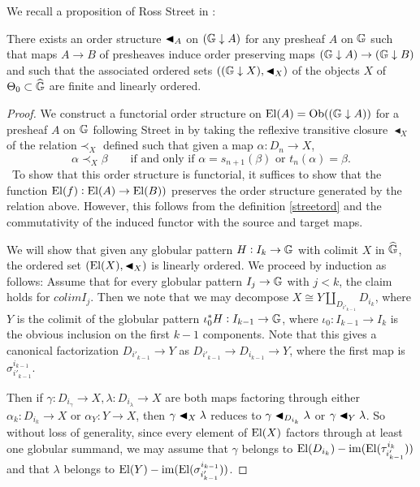 We recall a proposition of Ross Street in \cite{street}:

\begin{prop} There exists an order structure \(\blacktriangleleft_A\) on \({(\mathbb{G}\downarrow A)}\) for any presheaf \(A\) on \(\mathbb{G}\) such that maps \(A\to B\) of presheaves induce order preserving maps \({(\mathbb{G}\downarrow A)}\to {(\ensuremath{\mathbb{G}}\downarrow B)}\) and such that the associated ordered sets \(({(\mathbb{G}\downarrow X)}, \blacktriangleleft_X)\) of the objects \(X\) of \(\Theta_0\subset \widehat{\mathbb{G}}\) are finite and linearly ordered.
\end{prop}
\begin{proof}
We construct a functorial order structure on \(\operatorname{El}(A)=\operatorname{Ob}({(\mathbb{G}\downarrow A)})\) for a presheaf \(A\) on \(\mathbb{G}\) following Street in \cite{street} by taking the reflexive transitive closure \(\blacktriangleleft_X\) of the relation\(\prec_X\) defined such that given a map \(\alpha:D_n\to X\), 
\begin{equation}\label{streetord} \alpha \prec_X \beta \qquad \text{if and only if \(\alpha=s_{n+1}(\beta)\) or \(t_n(\alpha)=\beta\)}.\end{equation}\
To show that this order structure is functorial, it suffices to show that the function \(\operatorname{El}(f):\operatorname{El}(A)\to \operatorname{El}(B))\) preserves the order structure generated by the relation above.  However, this follows from the definition \eqref{streetord} and the commutativity of the induced functor with the source and target maps. 

We will show that given any globular pattern \(H:I_k \to \mathbb{G}\) with colimit \(X\) in \(\widehat{\mathbb{G}}\), the ordered set \((\operatorname{El}(X),\blacktriangleleft_X)\) is linearly ordered.  We proceed by induction as follows: Assume that for every globular pattern \(I_j\to \mathbb{G}\) with \(j<k\), the claim holds for \(colim I_j\).  Then we note that we may decompose \(X\cong Y\coprod_{D_{i'_{k-1}}} D_{i_k} \), where \(Y\) is the colimit of the globular pattern \(\iota_0^*H:I_{k-1}\to \mathbb{G}\), where \(\iota_0:I_{k-1}\to I_k\) is the obvious inclusion on the first \(k-1\) components.  Note that this gives a canonical factorization \(D_{i'_{k-1}}\to Y\) as \(D_{i'_{k-1}} \to D_{i_{k-1}} \to Y\), where the first map is \(\sigma^{i_{k-1}}_{i'_{k-1}}\).  

Then if \(\gamma:D_{i_\gamma}\to X, \lambda: D_{i_\lambda}\to X\) are both maps factoring through either \(\alpha_k:D_{i_k}\to X\) or \(\alpha_Y:Y\to X\), then \(\gamma \blacktriangleleft_X \lambda\) reduces to \(\gamma \blacktriangleleft_{D_{i_{k}}}\lambda\) or \(\gamma\blacktriangleleft_Y \lambda\).  So without loss of generality, since every element of \(\operatorname{El}(X)\) factors through at least one globular summand, we may assume that \(\gamma\) belongs to \(\operatorname{El}(D_{i_k}) - \operatorname{im}(\operatorname{El}(\tau^{i_k}_{i'_{k-1}}))\) and that \(\lambda\) belongs to \(\operatorname{El}(Y)-\operatorname{im}(\operatorname{El}(\sigma^{i_{k-1}}_{i'_{k-1}}))\).  


\end{proof}
